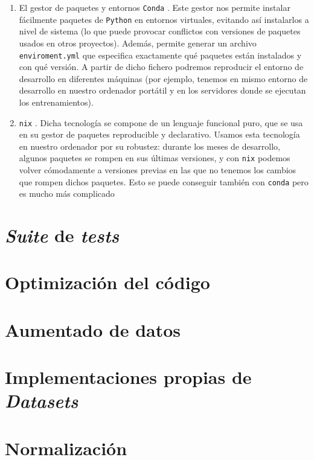 \begin{enumerate}
    \item El gestor de paquetes y entornos \lstinline{Conda} \cite{informatica:conda_web}. Este gestor nos permite instalar fácilmente paquetes de \lstinline{Python} en entornos virtuales, evitando así instalarlos a nivel de sistema (lo que puede provocar conflictos con versiones de paquetes usados en otros proyectos). Además, permite generar un archivo \lstinline{enviroment.yml} que especifica exactamente qué paquetes están instalados y con qué versión. A partir de dicho fichero podremos reproducir el entorno de desarrollo en diferentes máquinas (por ejemplo, tenemos en mismo entorno de desarrollo en nuestro ordenador portátil y en los servidores donde se ejecutan los entrenamientos).
    \item \lstinline{nix} \cite{informatica:nixos_web}. Dicha tecnología se compone de un lenguaje funcional puro, que se usa en su gestor de paquetes reproducible y declarativo. Usamos esta tecnología en nuestro ordenador por su robustez: durante los meses de desarrollo, algunos paquetes se rompen en sus últimas versiones, y con \lstinline{nix} podemos volver cómodamente a versiones previas en las que no tenemos los cambios que rompen dichos paquetes. Esto se puede conseguir también con \lstinline{conda} pero es mucho más complicado
\end{enumerate}



\section{\textit{Suite} de \textit{tests}} \label{isec:test_suite}

\section{Optimización del código} \label{isec:optimizacion_codigo}

\section{Aumentado de datos} \label{isec:aumentado_datos}

\section{Implementaciones propias de \textit{Datasets}} \label{isec:datasets_customs}

\section{Normalización}

